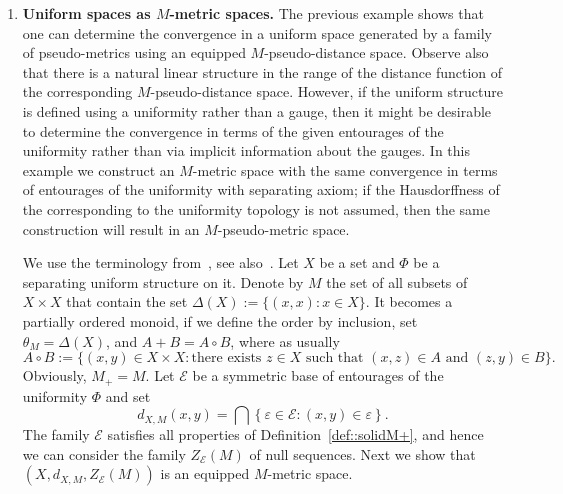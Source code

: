 \documentclass[12pt]{amsart}          %
\newcommand{\RR}{\mathbb R}
\newcommand{\EE}{\mathcal{E}}
\begin{document}
\begin{enumerate}[wide]
 {In general, the obtained space might be non-Hausdorff, but if all $d_{Y,M_\alpha}$ are $M$-pseudo-metrics and~\eqref{familyOfPseudoMetricsIsRich} holds, then the obtained space is $M$-metric and hence a Hausdorff space.

In the case, when $M_\alpha =\RR_+$ for all $\alpha\in A$, we obtain the classical definition of a gauge space. The family of sets
$
V_{\alpha,r} = \{(x,y)\in Y\times Y\colon d_{Y,M_\alpha}(x,y)<r\}, \alpha\in A, r>0, $
is a subbase of entourages of the uniformity generated by the family $\{d_{Y,M_\alpha}\}$, see e.g.~\cite[Chapter~6]{Kelley}.  The convergence in  $Y$ in the topology of the uniformity is the same as the one in the equipped $M$-pseudo-distance space $(Y, d_{Y,M},Z(M))$. 
 }
    
\item {\bf Uniform spaces as $M$-metric spaces.}\label{ex::uniformSpace}
{
The previous example shows that one can determine the convergence in a uniform space generated by a family of pseudo-metrics using an equipped $M$-pseudo-distance space. Observe also that there is a natural linear structure in the range of the distance function of the corresponding $M$-pseudo-distance space. However, if the uniform structure is defined using a uniformity rather than a gauge, then it might be desirable to determine the convergence in terms of the given entourages of the uniformity rather than via implicit information about the gauges. In this example we construct an $M$-metric space with the same convergence in terms of entourages of the uniformity with separating axiom; if the Hausdorffness of the corresponding to the uniformity topology is not assumed, then the same construction will result in an $M$-pseudo-metric space.
}

We use the terminology from~\cite[Chapter~6]{Kelley}, see also~\cite[Chapter~8]{Engelking}. 
  Let $X$ be a set and $\Phi$ be a separating uniform structure on it.
  Denote by $M$ the set of all 
  subsets of $X\times X$ that contain the set $\Delta(X):=\{(x,x)\colon x\in X\}$. It becomes a partially ordered monoid, if we define the order by inclusion, set  $\theta_M=\Delta(X)$, and $A + B = A\circ B$, where as usually
$$
       A\circ B:=\{(x,y)\in X\times X\colon \text{there exists } z\in X \text{ such that } 
       (x,z)\in A \text{ and } (z,y)\in B\}.
$$
    Obviously, $M_+ = M$.
    Let $\EE$ be a symmetric base of entourages of the uniformity $\Phi$ and set 
  $$
    d_{X,M}(x,y) = \bigcap\left\{\varepsilon\in \EE\colon (x,y)\in \varepsilon\right\}.
  $$
  The family $\EE$ satisfies all properties of Definition~\ref{def::solidM+}, and hence we can consider the family $Z_{\EE}(M)$ of null sequences.  Next we show that $(X, d_{X,M},  Z_{\EE}(M))$ is an equipped $M$-metric space.
  

\end{enumerate}
\end{document}
